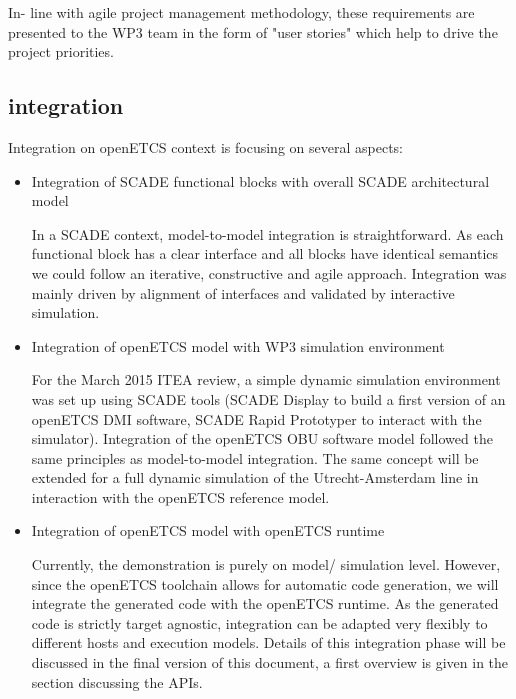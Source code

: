 In- line with agile project management methodology, these requirements are presented to the WP3 team in the form of "user stories" which help to drive the project priorities.

\subsection{integration}

Integration on openETCS context is focusing on several aspects:
\begin{itemize}

\item Integration of SCADE functional blocks with overall SCADE architectural model

In a SCADE context, model-to-model integration is straightforward. As each functional block has a clear interface and all blocks have identical semantics we could follow an iterative, constructive and agile approach.
Integration was mainly driven by alignment of interfaces and validated by interactive simulation. 


\item Integration of openETCS model with WP3 simulation environment 

For the March 2015 ITEA review, a simple dynamic simulation environment was set up using SCADE tools (SCADE Display to build a first version of an openETCS DMI software, SCADE Rapid Prototyper to interact with the simulator).
Integration of the openETCS OBU software model followed the same principles as model-to-model integration.
The same concept will be extended for a full dynamic simulation of the Utrecht-Amsterdam line in interaction with the openETCS reference model.


\item Integration of openETCS model with openETCS runtime

Currently, the demonstration is purely on model/ simulation level. However, since the openETCS toolchain allows for automatic code generation, we will integrate the generated code with the openETCS runtime. 
As the generated code is strictly target agnostic, integration can be adapted very flexibly to different hosts and execution models.
Details of this integration phase will be discussed in the final version of this document, a first overview is given in the section discussing the APIs.
%
%
%
%
\end{itemize}

